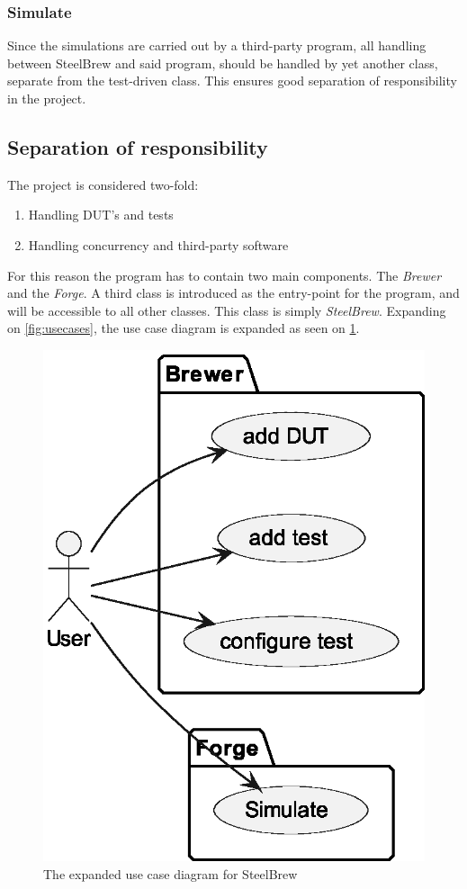 \subsubsection{Simulate}
Since the simulations are carried out by a third-party program, all handling between SteelBrew and said program, should be handled by yet another class, separate from the test-driven class. This ensures good separation of responsibility in the project.
\subsection{Separation of responsibility}
The project is considered two-fold:
\begin{enumerate}
    \item Handling DUT's and tests
    \item Handling concurrency and third-party software
\end{enumerate}
For this reason the program has to contain two main components. The \emph{Brewer} and the \emph{Forge}.
A third class is introduced as the entry-point for the program, and will be accessible to all other classes. This class is simply \emph{SteelBrew}.
Expanding on \cref{fig:usecases}, the use case diagram is expanded as seen on \cref{fig:usecases2}.
\begin{figure}
    \centering
    \caption{The expanded use case diagram for SteelBrew}\label{fig:usecases2}
    \includegraphics[width=.3\textwidth]{out/plantuml/usecase2/usecase2.eps}
\end{figure}
